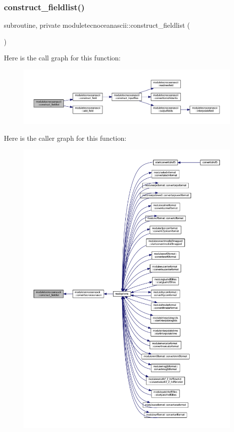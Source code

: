 \subsubsection{\texorpdfstring{construct\+\_\+fieldlist()}{construct\_fieldlist()}}
{\footnotesize\ttfamily subroutine, private moduletecnoceanascii\+::construct\+\_\+fieldlist (\begin{DoxyParamCaption}{ }\end{DoxyParamCaption})\hspace{0.3cm}{\ttfamily [private]}}

Here is the call graph for this function\+:\nopagebreak
\begin{figure}[H]
\begin{center}
\leavevmode
\includegraphics[width=350pt]{namespacemoduletecnoceanascii_af8c388a8fbef00e24b5198034a12ff26_cgraph}
\end{center}
\end{figure}
Here is the caller graph for this function\+:\nopagebreak
\begin{figure}[H]
\begin{center}
\leavevmode
\includegraphics[width=350pt]{namespacemoduletecnoceanascii_af8c388a8fbef00e24b5198034a12ff26_icgraph}
\end{center}
\end{figure}
